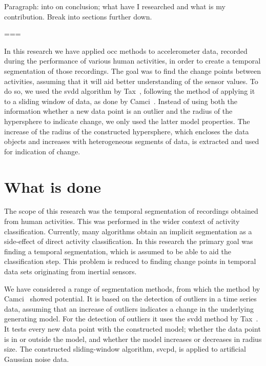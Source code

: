 Paragraph: into on conclusion; what have I researched and what is my contribution.
Break into sections further down.

===

In this research we have applied \gls{occ} methods to accelerometer data, recorded during the performance of various human activities, in order to create a temporal segmentation of those recordings.
The goal was to find the change points between activities, assuming that it will aid better understanding of the sensor values.
To do so, we used the \gls{svdd} algorithm by Tax~\cite{tax1999support}, following the method of applying it to a sliding window of data, as done by Camci~\cite{camci2010change}.
Instead of using both the information whether a new data point is an outlier and the radius of the hypersphere to indicate change, we only used the latter model properties.
The increase of the radius of the constructed hypersphere, which encloses the data objects and increases with heterogeneous segments of data, is extracted and used for indication of change.



\section{What is done}
The scope of this research was the temporal segmentation of recordings obtained from human activities.
This was performed in the wider context of activity classification.
Currently, many algorithms obtain an implicit segmentation as a side-effect of direct activity classification.
In this research the primary goal was finding a temporal segmentation, which is assumed to be able to aid the classification step.
This problem is reduced to finding change points in temporal data sets originating from inertial sensors.

We have considered a range of segmentation methods, from which the method by Camci~\cite{camci2010change} showed potential.
It is based on the detection of outliers in a time series data, assuming that an increase of outliers indicates a change in the underlying generating model.
For the detection of outliers it uses the \gls{svdd} method by Tax~\cite{tax1999support}.
It tests every new data point with the constructed model; whether the data point is in or outside the model, and whether the model increases or decreases in radius size.
The constructed sliding-window algorithm, \gls{svcpd}, is applied to artificial Gaussian noise data.

